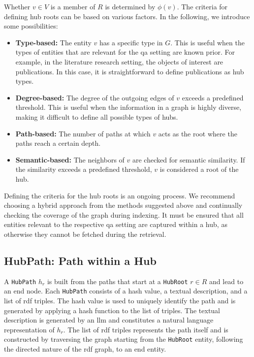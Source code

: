 Whether \(v \in V\) is a member of \(R\) is determined by \(\phi(v)\). The criteria for defining hub roots can be based on various factors. In the following, we introduce some possibilities:

\begin{itemize}
    \item \textbf{Type-based:} The entity \(v\) has a specific type in \(G\). This is useful when the types of entities that are relevant for the \gls{qa} setting are known prior. For example, in the literature research setting, the objects of interest are publications. In this case, it is straightforward to define publications as hub types. 
    \item \textbf{Degree-based:} The degree of the outgoing edges of \(v\) exceeds a predefined threshold. This is useful when the information in a graph is highly diverse, making it difficult to define all possible types of hubs.
    \item \textbf{Path-based:} The number of paths at which \(v\) acts as the root where the paths reach a certain depth. 
    \item \textbf{Semantic-based:} The neighbors of \(v\) are checked for semantic similarity. If the similarity exceeds a predefined threshold, \(v\) is considered a root of the hub.
\end{itemize}

Defining the criteria for the hub roots is an ongoing process. We recommend choosing a hybrid approach from the methods suggested above and continually checking the coverage of the graph during indexing. It must be ensured that all entities relevant to the respective \gls{qa} setting are captured within a hub, as otherwise they cannot be fetched during the retrieval.


\subsection{HubPath: Path within a Hub}

A \texttt{HubPath} $h_r$ is built from the paths that start at a \texttt{HubRoot} $r \in R$ and lead to an end node. Each \texttt{HubPath} consists of a hash value, a textual description, and a list of \gls{rdf} triples. The hash value is used to uniquely identify the path and is generated by applying a hash function to the list of triples. The textual description is generated by an \gls{llm} and constitutes a natural language representation of $h_r$. The list of \gls{rdf} triples represents the path itself and is constructed by traversing the graph starting from the \texttt{HubRoot} entity, following the directed nature of the \gls{rdf} graph, to an end entity. 

